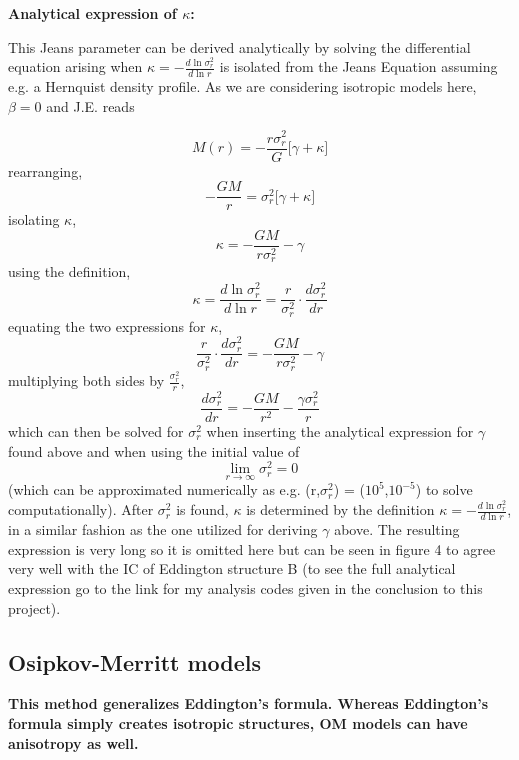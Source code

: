 \centerline{\textbf{Analytical expression of $\kappa$:}}
This Jeans parameter can be derived analytically by solving the differential equation arising when $\kappa = -\frac{d\ln\sigma_r^2}{d\ln r} $ is isolated from the Jeans Equation assuming e.g. a Hernquist density profile. As we are considering isotropic models here, $\beta = 0$ and J.E. reads

\begin{equation}
M(r)= -\frac{r \sigma_r^2}{G} \big[\gamma +\kappa] 
\end{equation}
rearranging,
\begin{equation}
-\frac{GM}{r} = \sigma_r^2 \big[\gamma +\kappa] 
\end{equation}
isolating $\kappa$,
\begin{equation}
\kappa = -\frac{GM}{r \sigma_r^2} - \gamma
\end{equation}
using the definition,
\begin{equation}
\kappa = \frac{d\ln\sigma_r^2}{d\ln r} = \frac{r}{\sigma_r^2}\cdot \frac{d \sigma_r^2}{dr}
\end{equation}
equating the two expressions for $\kappa$,
\begin{equation}
\frac{r}{\sigma_r^2}\cdot \frac{d \sigma_r^2}{dr} = -\frac{GM}{r \sigma_r^2} - \gamma
\end{equation}
multiplying both sides by $\frac{\sigma_r^2}{r}$,
\begin{equation}
\frac{d \sigma_r^2}{dr} = -\frac{GM}{r^2} - \frac{\gamma \sigma_r^2}{r} 
\end{equation}
which can then be solved for $\sigma_r^2$ when inserting the analytical expression for $\gamma$ found above and when using the initial value of \[ \lim_{r \to \infty} \sigma_r^2 = 0 \] (which can be approximated numerically as e.g. (r,$\sigma_r^2$) = ($10^5$,$10^{-5}$) to solve computationally).
After $\sigma_r^2$ is found, $\kappa$ is determined by the definition $\kappa = -\frac{d\ln\sigma_r^2}{d\ln r} $, in a similar fashion as the one utilized for deriving $\gamma$ above.
The resulting expression is very long so it is omitted here but can be seen in figure 4 to agree very well with the IC of Eddington structure B (to see the full analytical expression go to the link for my analysis codes given in the conclusion to this project).

\subsection{Osipkov-Merritt models}
\textbf{This method generalizes Eddington's formula. Whereas Eddington's formula simply creates isotropic structures, OM models can have anisotropy as well.} \\ 

